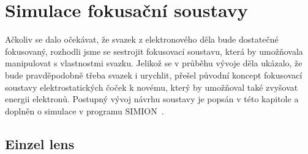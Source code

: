 \newpage
\chapter{Simulace fokusační soustavy}
\label{kapKuba}

Ačkoliv se dalo očekávat, že svazek z elektronového děla bude dostatečné fokusovaný, rozhodli jsme se sestrojit fokusovací soustavu, která by umožňovala manipulovat s vlastnostmi svazku. Jelikož se v průběhu vývoje děla ukázalo, že bude pravděpodobně třeba svazek i urychlit, přešel původní koncept fokusovací soustavy elektrostatických čoček k novému, který by umožňoval také zvyšovat energii elektronů. Postupný vývoj návrhu soustavy je popsán v této kapitole a doplněn o simulace v programu SIMION~\cite{05Simion}.

\section{Einzel lens}

